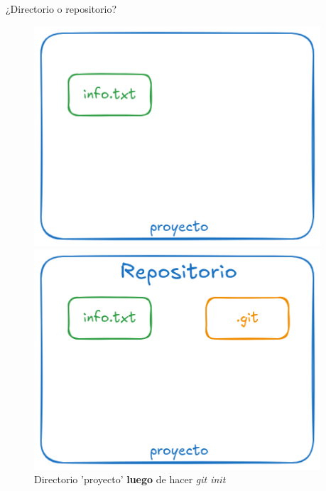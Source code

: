 \begin{frame}{¿Directorio o repositorio?}
    \begin{figure}
    \centering
    \begin{minipage}{0.45\textwidth}
        \centering        \includegraphics[width=0.95\textwidth]{graficos/carpeta.png} 
        \caption{Directorio 'proyecto' \textbf{antes} de hacer \textit{git init}}
    \end{minipage}\hfill
    \begin{minipage}{0.45\textwidth}
        \centering        \includegraphics[width=0.95\textwidth]{graficos/Repo.png} 
        \caption{Directorio 'proyecto' \textbf{luego} de hacer \textit{git init}}
    \end{minipage}
\end{figure}

    
\end{frame}

